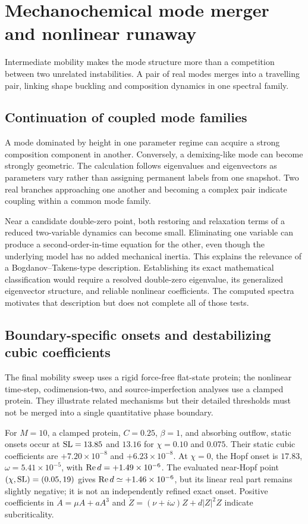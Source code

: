 \section{Mechanochemical mode merger and nonlinear runaway}\label{sec:merger}
Intermediate mobility makes the mode structure more than a competition between two unrelated instabilities. A pair of real modes merges into a travelling pair, linking shape buckling and composition dynamics in one spectral family.


\subsection{Continuation of coupled mode families}
A mode dominated by height in one parameter regime can acquire a strong composition component in another. Conversely, a demixing-like mode can become strongly geometric. The calculation follows eigenvalues and eigenvectors as parameters vary rather than assigning permanent labels from one snapshot. Two real branches approaching one another and becoming a complex pair indicate coupling within a common mode family.

Near a candidate double-zero point, both restoring and relaxation terms of a reduced two-variable dynamics can become small. Eliminating one variable can produce a second-order-in-time equation for the other, even though the underlying model has no added mechanical inertia. This explains the relevance of a Bogdanov--Takens-type description. Establishing its exact mathematical classification would require a resolved double-zero eigenvalue, its generalized eigenvector structure, and reliable nonlinear coefficients. The computed spectra motivates that description but does not complete all of those tests.


\subsection{Boundary-specific onsets and destabilizing cubic coefficients}


The final mobility sweep uses a rigid force-free flat-state protein; the nonlinear time-step, codimension-two, and source-imperfection analyses use a clamped protein. They illustrate related mechanisms but their detailed thresholds must not be merged into a single quantitative phase boundary.

For $M=10$, a clamped protein, $C=0.25$, $\beta=1$, and absorbing outflow, static onsets occur at $\mathrm{SL}=13.85$ and $13.16$ for $\chi=0.10$ and $0.075$. Their static cubic coefficients are $+7.20\times10^{-8}$ and $+6.23\times10^{-8}$. At $\chi=0$, the Hopf onset is $17.83$, $\omega=5.41\times10^{-5}$, with $\operatorname{Re} d=+1.49\times10^{-6}$. The evaluated near-Hopf point $(\chi,\mathrm{SL})=(0.05,19)$ gives $\operatorname{Re} d\simeq+1.46\times10^{-6}$, but its linear real part remains slightly negative; it is not an independently refined exact onset. Positive coefficients in $\dot A=\mu A+aA^3$ and $\dot Z=(\nu+i\omega)Z+d|Z|^2Z$ indicate subcriticality.

